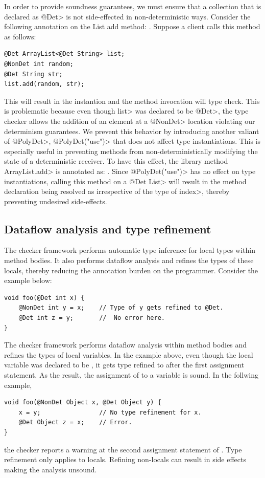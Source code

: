 In order to provide soundness guarantees, we must ensure that a collection that is
declared as \<@Det> is not side-effected in non-deterministic ways. Consider the following annotation 
on the List add method: .
Suppose a client calls this method as follows:
\begin{verbatim}
@Det ArrayList<@Det String> list;
@NonDet int random;
@Det String str;
list.add(random, str);
\end{verbatim}
This will result in the instantion  and
the method invocation will type check. This is problematic because even though \<list> was declared to be \<@Det>,
the type checker allows the addition of an element at a \<@NonDet> location violating our determinism guarantees.
We prevent this behavior by introducing another valiant of \<@PolyDet>, \<@PolyDet("use")> that does not affect
type instantiations. This is especially useful in preventing methods from non-deterministically modifying the state
of a deterministic receiver. To have this effect, the library method \<ArrayList.add> is annotated as:
.
Since \<@PolyDet("use")> has no effect on type instantiations, calling this method on a \<@Det List>
will result in the method declaration being resolved as 
irrespective of the type of \<index>, thereby preventing undesired side-effects.

\subsection{Dataflow analysis and type refinement}
The checker framework performs automatic type inference for local types within method bodies.
It also performs dataflow analysis and refines the types of these locals, thereby reducing the annotation burden 
on the programmer. Consider the example below:
\begin{verbatim}
void foo(@Det int x) {
    @NonDet int y = x;    // Type of y gets refined to @Det.
    @Det int z = y;       //  No error here.
}
\end{verbatim}
The checker framework performs dataflow analysis within method bodies and refines the types of local variables.
In the example above, even though the local variable  was declared to be , it gets
type refined to  after the first assignment statement. As the result, the assignment of 
to a  variable  is sound. In the follwing example,
\begin{verbatim}
void foo(@NonDet Object x, @Det Object y) {
    x = y;                // No type refinement for x.
    @Det Object z = x;    // Error.
}
\end{verbatim}
the checker reports a warning at the second assignment statement of . Type refinement only applies to locals. Refining non-locals can result in side effects making the analysis unsound.

